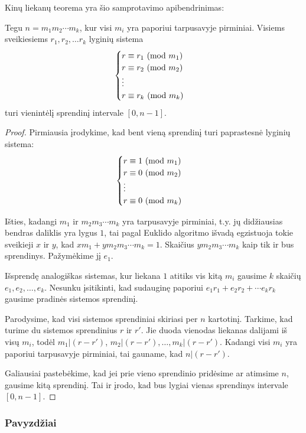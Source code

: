 Kinų liekanų teorema yra šio samprotavimo apibendrinimas:
\begin{thm}
  Tegu $n=m_1m_2\cdots m_k$, kur visi $m_i$ yra paporiui tarpusavyje
  pirminiai. Visiems sveikiesiems $r_1, r_2, \dots r_k$
  lyginių sistema 
  $$\begin{cases}
    r \equiv r_1 \ (\text{mod } m_1)\\
    r \equiv r_2 \ (\text{mod } m_2)\\
    \vdots\\
    r \equiv r_k \ (\text{mod } m_k)
  \end{cases}$$
  turi vienintėlį sprendinį intervale $[0,n-1]$.
\end{thm}

\begin{proof}
  
Pirmiausia įrodykime, kad bent vieną sprendinį turi paprastesnė lyginių
sistema:
$$\begin{cases}
    r \equiv 1 \ (\text{mod } m_1)\\
    r \equiv 0 \ (\text{mod } m_2)\\
    \vdots\\
    r \equiv 0 \ (\text{mod } m_k)
  \end{cases}$$

Išties, kadangi $m_1$ ir $m_2m_3\cdots m_k$ yra tarpusavyje pirminiai, t.y.
jų didžiausias bendras daliklis yra lygus $1$, tai pagal Euklido algoritmo
išvadą egzistuoja tokie sveikieji $x$ ir $y$, kad $xm_1 + y m_2m_3\cdots m_k =
1$. Skaičius $y m_2m_3\cdots m_k$ kaip tik ir bus sprendinys. Pažymėkime jį
$e_1$. 

Išsprendę analogiškas sistemas, kur liekana $1$ atitiks vis kitą
$m_i$ gausime $k$ skaičių $e_1, e_2, \dots, e_k$. Nesunku įsitikinti, kad
sudauginę paporiui $e_1r_1 + e_2r_2 + \cdots e_kr_k$ gausime pradinės
sistemos sprendinį.

Parodysime, kad visi sistemos sprendiniai skiriasi per $n$ kartotinį.
Tarkime, kad turime du sistemos sprendinius $r$ ir $r'$. Jie duoda vienodas
liekanas dalijami iš visų $m_i$, todėl $m_1|(r-r')$, $m_2|(r-r'), \dots,
m_k|(r-r')$. Kadangi visi $m_i$ yra paporiui tarpusavyje pirminiai, tai
gauname, kad $n|(r-r')$. 

Galiausiai pastebėkime, kad jei prie vieno sprendinio pridėsime ar atimsime
$n$, gausime kitą sprendinį. Tai ir įrodo, kad bus lygiai vienas sprendinys
intervale $[0,n-1]$.
\end{proof}

\subsubsection{Pavyzdžiai}


